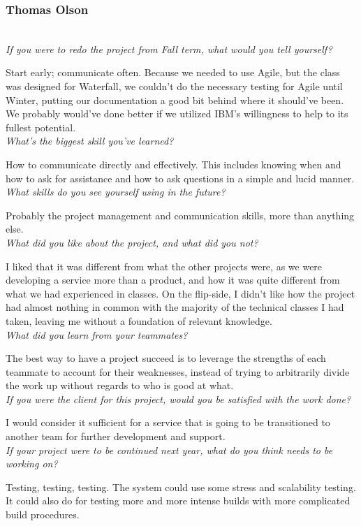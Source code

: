 \documentclass[10pt,letterpaper,onecolumn,draftclsnofoot]{IEEEtran}
\begin{document}
\subsubsection{Thomas Olson}
\textit{\\If you were to redo the project from Fall term, what would you tell yourself?}

Start early; communicate often. Because we needed to use Agile, but the class was designed for Waterfall, we couldn't do the necessary testing for Agile until Winter, putting our documentation a good bit behind where it should've been. We probably would've done better if we utilized IBM's willingness to help to its fullest potential.
\textit{\\What's the biggest skill you've learned?}

How to communicate directly and effectively. This includes knowing when and how to ask for assistance and how to ask questions in a simple and lucid manner.
\textit{\\What skills do you see yourself using in the future?}

Probably the project management and communication skills, more than anything else.
\textit{\\What did you like about the project, and what did you not?}

I liked that it was different from what the other projects were, as we were developing a service more than a product, and how it was quite different from what we had experienced in classes. On the flip-side, I didn't like how the project had almost nothing in common with the majority of the technical classes I had taken, leaving me without a foundation of relevant knowledge.
\textit{\\What did you learn from your teammates?}

The best way to have a project succeed is to leverage the strengths of each teammate to account for their weaknesses, instead of trying to arbitrarily divide the work up without regards to who is good at what.
\textit{\\If you were the client for this project, would you be satisfied with the work done?}

I would consider it sufficient for a service that is going to be transitioned to another team for further development and support.
\textit{\\If your project were to be continued next year, what do you think needs to be working on?}

Testing, testing, testing. The system could use some stress and scalability testing. It could also do for testing more and more intense builds with more complicated build procedures.\\
\end{document}
